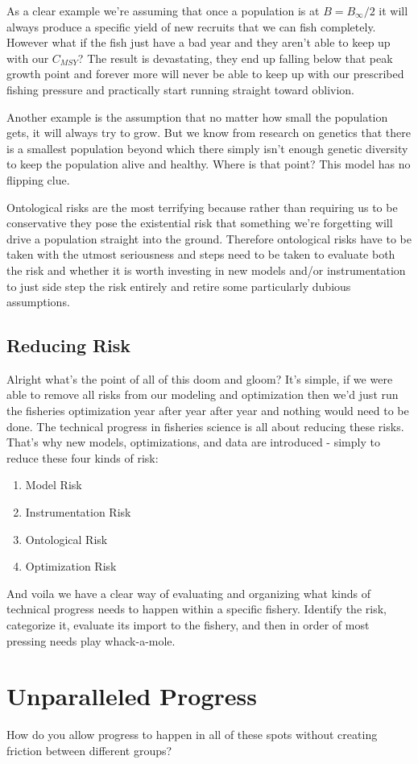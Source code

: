 \documentclass[11pt,a5paper]{book}
\begin{document}
As a clear example we're assuming that once a population is at $B=B_\infty / 2$ it will always produce a specific yield of new recruits that we can fish completely. However what if the fish just have a bad year and they aren't able to keep up with our $C_{MSY}$? The result is devastating, they end up falling below that peak growth point and forever more will never be able to keep up with our prescribed fishing pressure and practically start running straight toward oblivion. 
\newline

Another example is the assumption that no matter how small the population gets, it will always try to grow. But we know from research on genetics that there is a smallest population beyond which there simply isn't enough genetic diversity to keep the population alive and healthy. Where is that point? This model has no flipping clue. 
\newline

Ontological risks are the most terrifying because rather than requiring us to be conservative they pose the existential risk that something we're forgetting will drive a population straight into the ground. Therefore ontological risks have to be taken with the utmost seriousness and steps need to be taken to evaluate both the risk and whether it is worth investing in new models and/or instrumentation to just side step the risk entirely and retire some particularly dubious assumptions. 

\subsection{Reducing Risk}
Alright what's the point of all of this doom and gloom? It's simple, if we were able to remove all risks from our modeling and optimization then we'd just run the fisheries optimization year after year after year and nothing would need to be done. The technical progress in fisheries science is all about reducing these risks. That's why new models, optimizations, and data are introduced - simply to reduce these four kinds of risk:

\begin{enumerate}
\item Model Risk
\item Instrumentation Risk
\item Ontological Risk
\item Optimization Risk
\end{enumerate}

And voila we have a clear way of evaluating and organizing what kinds of technical progress needs to happen within a specific fishery. Identify the risk, categorize it, evaluate its import to the fishery, and then in order of most pressing needs play whack-a-mole. 
\newpage

\section{Unparalleled Progress}

How do you allow progress to happen in all of these spots without creating friction between different groups? 














\end{document}
